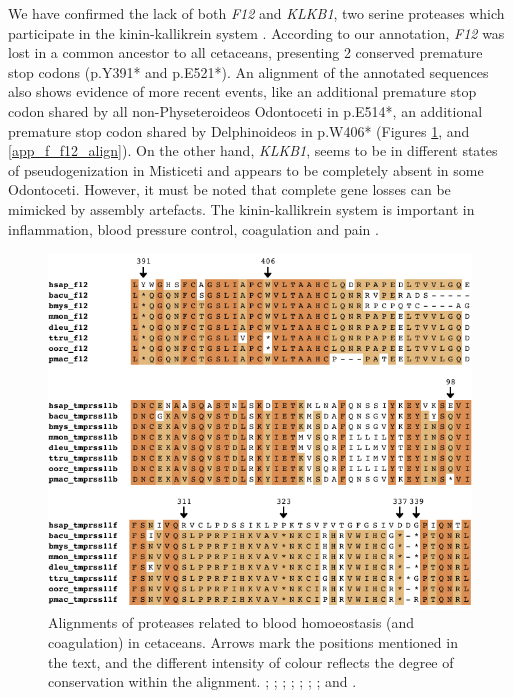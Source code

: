 We have confirmed the lack of both \textit{F12} and \textit{KLKB1}, two serine proteases which participate in the kinin-kallikrein system \cite{Irmscher2018}.
According to our annotation, \textit{F12} was lost in a common ancestor to all cetaceans, presenting 2 conserved premature stop codons ({p.Y391*} and {p.E521*}).
An alignment of the annotated sequences also shows evidence of more recent events, like an additional premature stop codon shared by all non-Physeteroideos Odontoceti in {p.E514*}, an additional premature stop codon shared by Delphinoideos in {p.W406*} (Figures \ref{f_results_sperm_whale_alignments_blood}, and \ref{app_f_f12_align}).
On the other hand, \textit{KLKB1}, seems to be in different states of pseudogenization in Misticeti and appears to be completely absent in some Odontoceti.
However, it must be noted that complete gene losses can be mimicked by assembly artefacts.
The kinin-kallikrein system is important in inflammation, blood pressure control, coagulation and pain \cite{Verweij2013a}.

\begin{figure}[t!]
    \begin{center}
        \includegraphics[width=\textwidth]{figures/alignment_blood.pdf}
        \caption[Alignments of proteases related to blood homoeostasis in cetaceans]{\footnotesize Alignments of proteases related to blood homoeostasis (and coagulation) in cetaceans. Arrows mark the positions mentioned in the text, and the different intensity of colour reflects the degree of conservation within the alignment. \hsap; \bacu; \bmys; \mmon; \dleu; \ttru; \oorc; and \pmac.} 
        \label{f_results_sperm_whale_alignments_blood}
    \end{center}
\end{figure}

